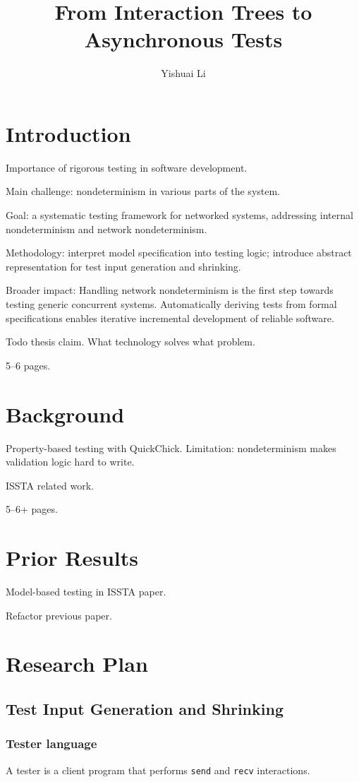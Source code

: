 \documentclass{article}
\title{From Interaction Trees to Asynchronous Tests}
\author{Yishuai Li}
\newcommand{\ilc}[1]{\lstinline[style=customcoq]{#1}}
\begin{document}
\maketitle
\section{Introduction}
Importance of rigorous testing in software development.

Main challenge: nondeterminism in various parts of the system.

Goal: a systematic testing framework for networked systems, addressing internal
nondeterminism and network nondeterminism.

Methodology: interpret model specification into testing logic; introduce
abstract representation for test input generation and shrinking.

Broader impact: Handling network nondeterminism is the first step towards
testing generic concurrent systems.  Automatically deriving tests from formal
specifications enables iterative incremental development of reliable software.

Todo thesis claim.  What technology solves what problem.

5--6 pages.

\section{Background}
Property-based testing with QuickChick.  Limitation: nondeterminism makes
validation logic hard to write.

ISSTA related work.

5--6+ pages.

\section{Prior Results}
Model-based testing in ISSTA paper.

Refactor previous paper.

\section{Research Plan}
\subsection{Test Input Generation and Shrinking}

\subsubsection{Tester language}
A tester is a client program that performs \ilc{send} and \ilc{recv} interactions.
\end{document}
